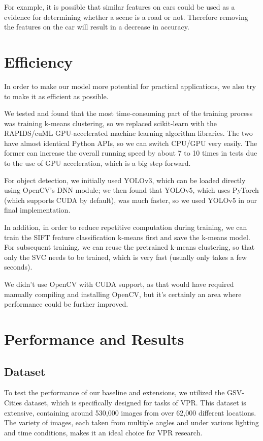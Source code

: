 \documentclass[conference]{IEEEtran}
\begin{document}
For example, it is possible that similar features on cars could be used as a evidence for determining whether a scene is a road or not. Therefore removing the features on the car will result in a decrease in accuracy.

\section{Efficiency}

In order to make our model more potential for practical applications, we also try to make it as efficient as possible. 

We tested and found that the most time-consuming part of the training process was training k-means clustering, so we replaced scikit-learn with the RAPIDS/cuML GPU-accelerated machine learning algorithm libraries. The two have almost identical Python APIs, so we can switch CPU/GPU very easily. The former can increase the overall running speed by about 7 to 10 times in tests due to the use of GPU acceleration, which is a big step forward.

For object detection, we initially used YOLOv3, which can be loaded directly using OpenCV's DNN module; we then found that YOLOv5, which uses PyTorch (which supports CUDA by default), was much faster, so we used YOLOv5 in our final implementation.

In addition, in order to reduce repetitive computation during training, we can train the SIFT feature classification k-means first and save the k-means model. For subsequent training, we can reuse the pretrained k-means clustering, so that only the SVC needs to be trained, which is very fast (usually only takes a few seconds).

We didn't use OpenCV with CUDA support, as that would have required manually compiling and installing OpenCV, but it's certainly an area where performance could be further improved.

\section{Performance and Results}

\subsection{Dataset}

To test the performance of our baseline and extensions, we utilized the GSV-Cities dataset\cite{ali2022gsv}, which is specifically designed for tasks of VPR. This dataset is extensive, containing around 530,000 images from over 62,000 different locations. The variety of images, each taken from multiple angles and under various lighting and time conditions, makes it an ideal choice for VPR research.
\end{document}
